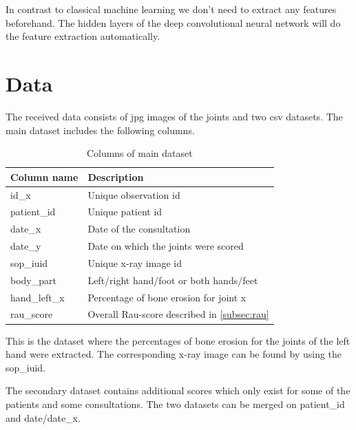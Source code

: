 \documentclass[12pt]{article}
\begin{document}
In contrast to classical machine learning we don't need to extract any features beforehand. The hidden layers of the deep convolutional neural network will do the feature extraction automatically.

\newpage
\section{Data}
\label{sec:data}

The received data consists of jpg images of the joints and two csv datasets. The main dataset includes the following columns.

\begin{table}[ht]
\centering
\caption{Columns of main dataset}
\label{tab:main_dataset}
\begin{tabular}{@{}ll@{}}
\toprule
Column name   & Description                                           \\ \midrule
id\_x         & Unique observation id                                 \\
patient\_id   & Unique patient id                                     \\
date\_x       & Date of the consultation                              \\
date\_y       & Date on which the joints were scored                  \\
sop\_iuid     & Unique x-ray image id                                 \\
body\_part    & Left/right hand/foot or both hands/feet               \\
hand\_left\_x & Percentage of bone erosion for joint x                \\
rau\_score    & Overall Rau-score described in \autoref{subsec:rau} \\ \bottomrule
\end{tabular}
\end{table}

This is the dataset where the percentages of bone erosion for the joints of the left hand were extracted. The corresponding x-ray image can be found by using the sop\_iuid.

The secondary dataset contains additional scores which only exist for some of the patients and some consultations. The two datasets can be merged on patient\_id and date/date\_x.
\end{document}
